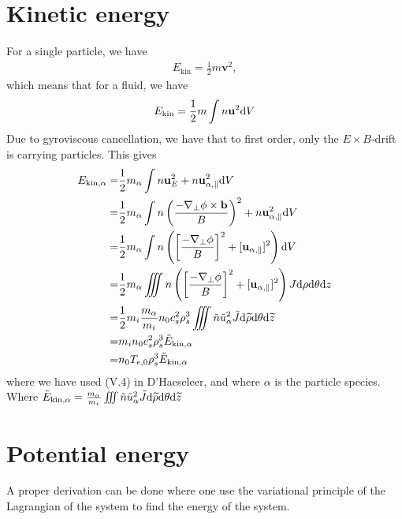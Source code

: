 \section{Kinetic energy}
For a single particle, we have
%
\begin{align*}
E_{\text{kin}} = \frac{1}{2}m\mathbf{v}^2,
\end{align*}
%
which means that for a fluid, we have
%
\begin{align*}
E_{\text{kin}}=\frac{1}{2}m\int n\mathbf{u}^2 \text{d} V
\end{align*}
%
Due to gyroviscous cancellation, we have that to first order, only the $E\times B$-drift is carrying particles.
This gives
%
\begin{align*}
    E_{\text{kin},\alpha}
    =& \frac{1}{2}m_{\alpha}\int
       n\mathbf{u}_E^2
       + n\mathbf{u}_{\alpha,\parallel}^2 \text{d} V
     \\
    =& \frac{1}{2}m_{\alpha}\int
       n\left(\frac{-\nabla_\perp\phi
              \times\mathbf{b}}{B}\right)^2
       + n\mathbf{u}_{\alpha,\parallel}^2 \text{d} V
    \\
    =& \frac{1}{2}m_{\alpha}\int
       n\left(\left[\frac{-\nabla_\perp\phi}{B}\right]^2
       + [\mathbf{u}_{\alpha,\parallel}]^2\right) \text{d} V
   \\
    =& \frac{1}{2}m_{\alpha}\iiint
       n\left(\left[\frac{-\nabla_\perp\phi}{B}\right]^2
       + [\mathbf{u}_{\alpha,\parallel}]^2\right)
       J \text{d}\rho \text{d}\theta \text{d} z
    \\
    =& \frac{1}{2}m_i\frac{m_{\alpha}}{m_i}
       n_0c_s^2\rho_s^3
       \iiint
       \tilde{n}\tilde{u}_\alpha^2
       \tilde{J} \text{d} \widetilde{ \rho} \text{d}\theta \text{d} \widetilde{ z}
    \\
    =& m_in_0c_s^2\rho_s^3 \tilde{E}_{\text{kin},\alpha}
    \\
    =& n_0T_{e,0}\rho_s^3 \tilde{E}_{\text{kin},\alpha}
\end{align*}
%
where we have used (V.4) in D'Haeseleer, and where $\alpha$ is the particle species.
Where $\tilde{E}_{\text{kin},\alpha} = \frac{m_{\alpha}}{m_i}\iiint \tilde{n}\tilde{u}_\alpha^2 \tilde{J} \text{d} \widetilde{ \rho} \text{d}\theta \text{d} \widetilde{ z}$

\section{Potential energy}
%
A proper derivation can be done where one use the variational principle of the Lagrangian of the system to find the energy of the system.

